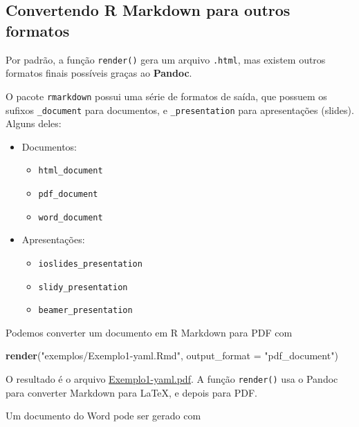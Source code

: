 \documentclass[10pt,a4paper]{book}
\newenvironment{Shaded}{\begin{snugshade}}{\end{snugshade}}
\newcommand{\KeywordTok}[1]{\textcolor[rgb]{0.13,0.29,0.53}{\textbf{#1}}}
\newcommand{\DataTypeTok}[1]{\textcolor[rgb]{0.13,0.29,0.53}{#1}}
\newcommand{\StringTok}[1]{\textcolor[rgb]{0.31,0.60,0.02}{#1}}
\newcommand{\NormalTok}[1]{#1}
\providecommand{\tightlist}{%
  \setlength{\itemsep}{0pt}\setlength{\parskip}{0pt}}
\begin{document}
\subsection{Convertendo R Markdown para outros
formatos}\label{convertendo-r-markdown-para-outros-formatos}

Por padrão, a função \texttt{render()} gera um arquivo \texttt{.html},
mas existem outros formatos finais possíveis graças ao \textbf{Pandoc}.

O pacote \texttt{rmarkdown} possui uma série de formatos de saída, que
possuem os sufixos \texttt{\_document} para documentos, e
\texttt{\_presentation} para apresentações (slides). Alguns deles:

\begin{itemize}
\tightlist
\item
  Documentos:

  \begin{itemize}
  \tightlist
  \item
    \texttt{html\_document}
  \item
    \texttt{pdf\_document}
  \item
    \texttt{word\_document}
  \end{itemize}
\item
  Apresentações:

  \begin{itemize}
  \tightlist
  \item
    \texttt{ioslides\_presentation}
  \item
    \texttt{slidy\_presentation}
  \item
    \texttt{beamer\_presentation}
  \end{itemize}
\end{itemize}

Podemos converter um documento em R Markdown para PDF com

\begin{Shaded}
\begin{Highlighting}[]
\KeywordTok{render}\NormalTok{(}\StringTok{"exemplos/Exemplo1-yaml.Rmd"}\NormalTok{, }\DataTypeTok{output_format =} \StringTok{"pdf_document"}\NormalTok{)}
\end{Highlighting}
\end{Shaded}

O resultado é o arquivo
\href{exemplos/Exemplo1-yaml.pdf}{Exemplo1-yaml.pdf}. A função
\texttt{render()} usa o Pandoc para converter Markdown para LaTeX, e
depois para PDF.

Um documento do Word pode ser gerado com
\end{document}
